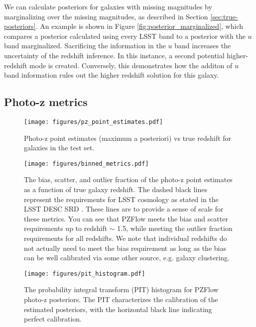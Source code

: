 \documentclass[twocolumn,twocolappendix]{aastex631}
\begin{document}
We can calculate posteriors for galaxies with missing magnitudes by marginalizing over the missing magnitudes, as described in Section \ref{sec:true-posteriors}.
An example is shown in Figure \ref{fig:posterior_marginalized}, which compares a posterior calculated using every LSST band to a posterior with the $u$ band marginalized.
Sacrificing the information in the $u$ band increases the uncertainty of the redshift inference.
In this instance, a second potential higher-redshift mode is created.
Conversely, this demonstrates how the additon of $u$ band information rules out the higher redshift solution for this galaxy.


\subsection{Photo-z metrics}

\begin{figure}[t]
    \begin{centering}
        \texttt{[image: figures/pz\_point\_estimates.pdf]}
        \caption{
            Photo-z point estimates (maximum a posteriori) vs true redshift for galaxies in the test set.
        }
        \label{fig:point-estimates}
    \end{centering}
\end{figure}

\begin{figure*}[t]
    \begin{centering}
        \texttt{[image: figures/binned\_metrics.pdf]}
        \caption{
            The bias, scatter, and outlier fraction of the photo-z point estimates as a function of true galaxy redshift.
            The dashed black lines represent the requirements for LSST cosmology as stated in the LSST DESC SRD \citep{descSRD}.
            These lines are to provide a sense of scale for these metrics.
            You can see that PZFlow meets the bias and scatter requirements up to redshift $\sim$ 1.5, while meeting the outlier fraction requirements for all redshifts.
            We note that individual redshifts do not actually need to meet the bias requirement as long as the bias can be well calibrated via some other source, e.g. galaxy clustering.
        }
        \label{fig:binned-metrics}
    \end{centering}
\end{figure*}

\begin{figure}[t]
    \begin{centering}
        \texttt{[image: figures/pit\_histogram.pdf]}
        \caption{
            The probability integral transform (PIT) histogram for PZFlow photo-z posteriors.
            The PIT characterizes the calibration of the estimated posteriors, with the horizontal black line indicating perfect calibration.
        }
        \label{fig:pit-histogram}
    \end{centering}
\end{figure}
\end{document}
